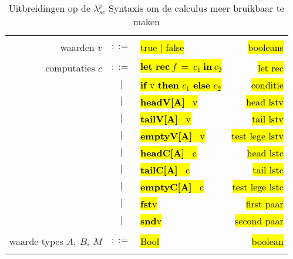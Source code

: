 \begin{table}
    \centering
    \begin{tabular}{|r c l r|}
    \hline 
        & & & \\
        waarden $v$ & $::=$ & \hl{true | false} & \hl{booleans} \\
        & & & \\
         computaties $c$ & $::=$ & \hl{$\textbf{let rec} \: f \: = \: c_{1} \: \textbf{in} \: c_{2}$} & \hl{let rec} \\
         & $|$ & \hl{\textbf{if} v \textbf{then} $c_1$ \textbf{else} $c_2$} & \hl {conditie} \\
          & $|$ & \hl{\textbf{headV[A]} \ v} & \hl{head lstv} \\
          & $|$ & \hl{\textbf{tailV[A]} \ v} & \hl{tail lstv} \\
          & $|$ & \hl{\textbf{emptyV[A]} \ v} & \hl{test lege lstv} \\
          & $|$ & \hl{\textbf{headC[A]} \ c} & \hl{head lstc} \\
          & $|$ & \hl{\textbf{tailC[A]} \ c} & \hl{tail lstc} \\
          & $|$ & \hl{\textbf{emptyC[A]} \ c} & \hl{test lege lstc} \\
          & $|$ & \hl{\textbf{fst}\:v} & \hl{first paar} \\
          & $|$ & \hl{\textbf{snd}\:v} & \hl{second paar} \\
          & & & \\
          waarde types $A, \: B, \: M$ & $::=$ & \hl{Bool} & \hl{boolean} \\ 
         & & & \\
    \hline
    \end{tabular}
    \caption{Uitbreidingen op de $\lambda_{sc}^{p}$ Syntaxis om de calculus meer bruikbaar te maken}
    \label{fig:syntaxisHandig}
\end{table}

